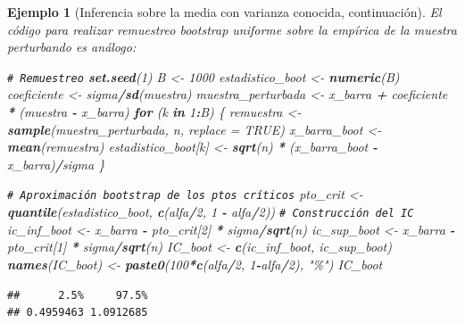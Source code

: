 \documentclass[
]{book}
\newenvironment{Shaded}{\begin{snugshade}}{\end{snugshade}}
\newcommand{\AttributeTok}[1]{\textcolor[rgb]{0.13,0.29,0.53}{#1}}
\newcommand{\CommentTok}[1]{\textcolor[rgb]{0.56,0.35,0.01}{\textit{#1}}}
\newcommand{\ConstantTok}[1]{\textcolor[rgb]{0.56,0.35,0.01}{#1}}
\newcommand{\ControlFlowTok}[1]{\textcolor[rgb]{0.13,0.29,0.53}{\textbf{#1}}}
\newcommand{\DecValTok}[1]{\textcolor[rgb]{0.00,0.00,0.81}{#1}}
\newcommand{\FunctionTok}[1]{\textcolor[rgb]{0.13,0.29,0.53}{\textbf{#1}}}
\newcommand{\NormalTok}[1]{#1}
\newcommand{\OtherTok}[1]{\textcolor[rgb]{0.56,0.35,0.01}{#1}}
\newcommand{\SpecialCharTok}[1]{\textcolor[rgb]{0.81,0.36,0.00}{\textbf{#1}}}
\newcommand{\StringTok}[1]{\textcolor[rgb]{0.31,0.60,0.02}{#1}}
\theoremstyle{break}
\newtheorem{example}{Ejemplo}[chapter]
\theoremstyle{nonumberplain}
\renewcommand{\CommentTok}[1]{\textcolor[rgb]{0.41,0.41,0.41}{\texttt{#1}}}
\begin{document}
\begin{example}[Inferencia sobre la media con varianza conocida, continuación]
El código para realizar remuestreo bootstrap uniforme sobre la empírica de la
muestra perturbando es análogo:

\begin{Shaded}
\begin{Highlighting}[]
\CommentTok{\# Remuestreo}
\FunctionTok{set.seed}\NormalTok{(}\DecValTok{1}\NormalTok{)}
\NormalTok{B }\OtherTok{\textless{}{-}} \DecValTok{1000}
\NormalTok{estadistico\_boot }\OtherTok{\textless{}{-}} \FunctionTok{numeric}\NormalTok{(B)}
\NormalTok{coeficiente }\OtherTok{\textless{}{-}}\NormalTok{ sigma}\SpecialCharTok{/}\FunctionTok{sd}\NormalTok{(muestra)}
\NormalTok{muestra\_perturbada }\OtherTok{\textless{}{-}}\NormalTok{ x\_barra }\SpecialCharTok{+}\NormalTok{ coeficiente }\SpecialCharTok{*}\NormalTok{ (muestra }\SpecialCharTok{{-}}\NormalTok{ x\_barra)}
\ControlFlowTok{for}\NormalTok{ (k }\ControlFlowTok{in} \DecValTok{1}\SpecialCharTok{:}\NormalTok{B) \{}
\NormalTok{  remuestra }\OtherTok{\textless{}{-}} \FunctionTok{sample}\NormalTok{(muestra\_perturbada, n, }\AttributeTok{replace =} \ConstantTok{TRUE}\NormalTok{)}
\NormalTok{  x\_barra\_boot }\OtherTok{\textless{}{-}} \FunctionTok{mean}\NormalTok{(remuestra)}
\NormalTok{  estadistico\_boot[k] }\OtherTok{\textless{}{-}} \FunctionTok{sqrt}\NormalTok{(n) }\SpecialCharTok{*}\NormalTok{ (x\_barra\_boot }\SpecialCharTok{{-}}\NormalTok{ x\_barra)}\SpecialCharTok{/}\NormalTok{sigma}
\NormalTok{\}}

\CommentTok{\# Aproximación bootstrap de los ptos críticos}
\NormalTok{pto\_crit }\OtherTok{\textless{}{-}} \FunctionTok{quantile}\NormalTok{(estadistico\_boot, }\FunctionTok{c}\NormalTok{(alfa}\SpecialCharTok{/}\DecValTok{2}\NormalTok{, }\DecValTok{1} \SpecialCharTok{{-}}\NormalTok{ alfa}\SpecialCharTok{/}\DecValTok{2}\NormalTok{))}
\CommentTok{\# Construcción del IC}
\NormalTok{ic\_inf\_boot }\OtherTok{\textless{}{-}}\NormalTok{ x\_barra }\SpecialCharTok{{-}}\NormalTok{ pto\_crit[}\DecValTok{2}\NormalTok{] }\SpecialCharTok{*}\NormalTok{ sigma}\SpecialCharTok{/}\FunctionTok{sqrt}\NormalTok{(n)}
\NormalTok{ic\_sup\_boot }\OtherTok{\textless{}{-}}\NormalTok{ x\_barra }\SpecialCharTok{{-}}\NormalTok{ pto\_crit[}\DecValTok{1}\NormalTok{] }\SpecialCharTok{*}\NormalTok{ sigma}\SpecialCharTok{/}\FunctionTok{sqrt}\NormalTok{(n)}
\NormalTok{IC\_boot }\OtherTok{\textless{}{-}} \FunctionTok{c}\NormalTok{(ic\_inf\_boot, ic\_sup\_boot)}
\FunctionTok{names}\NormalTok{(IC\_boot) }\OtherTok{\textless{}{-}} \FunctionTok{paste0}\NormalTok{(}\DecValTok{100}\SpecialCharTok{*}\FunctionTok{c}\NormalTok{(alfa}\SpecialCharTok{/}\DecValTok{2}\NormalTok{, }\DecValTok{1}\SpecialCharTok{{-}}\NormalTok{alfa}\SpecialCharTok{/}\DecValTok{2}\NormalTok{), }\StringTok{"\%"}\NormalTok{)}
\NormalTok{IC\_boot}
\end{Highlighting}
\end{Shaded}

\begin{verbatim}
##      2.5%     97.5% 
## 0.4959463 1.0912685
\end{verbatim}

\end{example}
\end{document}
